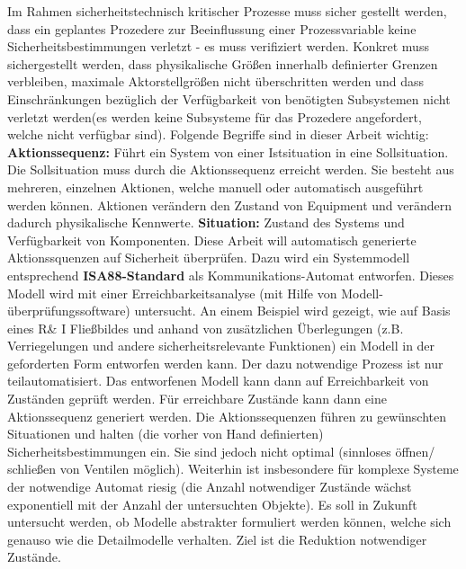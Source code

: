 Im Rahmen sicherheitstechnisch kritischer Prozesse muss sicher gestellt werden, dass ein geplantes Prozedere zur Beeinflussung einer Prozessvariable keine Sicherheitsbestimmungen verletzt - es muss verifiziert werden. Konkret muss sichergestellt werden, dass physikalische Gr\"o\ss{}en innerhalb definierter Grenzen verbleiben, maximale Aktorstellgr\"o\ss{}en nicht \"uberschritten werden und dass Einschr\"ankungen bez\"uglich der Verf\"ugbarkeit von ben\"otigten Subsystemen nicht verletzt werden(es werden keine Subsysteme f\"ur das Prozedere angefordert, welche nicht verf\"ugbar sind). Folgende Begriffe sind in dieser Arbeit wichtig: \textbf{Aktionssequenz:} F\"uhrt ein System von einer Istsituation in eine Sollsituation. Die Sollsituation muss durch die Aktionssequenz erreicht werden. Sie besteht aus mehreren, einzelnen Aktionen, welche manuell oder automatisch ausgef\"uhrt werden k\"onnen. Aktionen ver\"andern den Zustand von Equipment und ver\"andern dadurch physikalische Kennwerte.  \textbf{Situation:} Zustand des Systems und Verf\"ugbarkeit von Komponenten. Diese Arbeit will automatisch generierte Aktionssquenzen auf Sicherheit \"uberpr\"ufen. Dazu wird ein Systemmodell entsprechend \textbf{ISA88-Standard} als Kommunikations-Automat entworfen. Dieses Modell wird mit einer Erreichbarkeitsanalyse (mit Hilfe von Modell-\"uberpr\"ufungssoftware) untersucht. An einem Beispiel wird gezeigt, wie auf Basis eines R\& I Flie\ss{}bildes und anhand von zus\"atzlichen \"Uberlegungen (z.B. Verriegelungen und andere sicherheitsrelevante Funktionen) ein Modell in der geforderten Form entworfen werden kann. Der dazu notwendige Prozess ist nur teilautomatisiert. Das entworfenen Modell kann dann auf Erreichbarkeit von Zust\"anden gepr\"uft werden. F\"ur erreichbare Zust\"ande kann dann eine Aktionssequenz generiert werden. Die Aktionssequenzen f\"uhren zu gew\"unschten Situationen und halten (die vorher von Hand definierten) Sicherheitsbestimmungen ein. Sie sind jedoch nicht optimal (sinnloses \"offnen/ schlie\ss{}en von Ventilen m\"oglich).  Weiterhin ist insbesondere f\"ur komplexe Systeme der notwendige Automat riesig (die Anzahl notwendiger Zust\"ande w\"achst exponentiell mit der Anzahl der untersuchten Objekte). Es soll in Zukunft untersucht werden, ob Modelle abstrakter formuliert werden k\"onnen, welche sich genauso wie die Detailmodelle verhalten. Ziel ist die Reduktion notwendiger Zust\"ande. \hfill \newline
